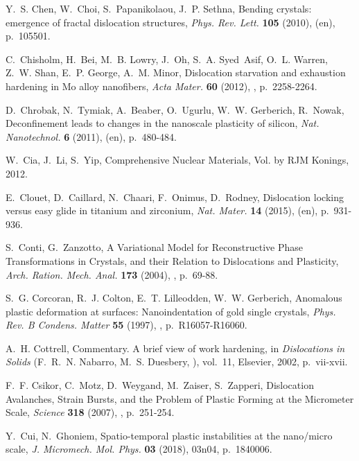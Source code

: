 \documentclass[CRPHYS,Unicode,manuscript]{cedram}
\begin{document}
\begin{thebibliography}{100}
Y.~S. Chen, W.~Choi, S.~Papanikolaou, J.~P. Sethna, {\og Bending crystals:
  emergence of fractal dislocation structures\fg}, \emph{Phys. Rev. Lett.}
  \textbf{105} (2010),  (en), p.~105501.

C.~Chisholm, H.~Bei, M.~B. Lowry, J.~Oh, S.~A. Syed~Asif, O.~L. Warren, Z.~W.
  Shan, E.~P. George, A.~M. Minor, {\og Dislocation starvation and exhaustion
  hardening in Mo alloy nanofibers\fg}, \emph{Acta Mater.} \textbf{60} (2012),
  , p.~2258-2264.

D.~Chrobak, N.~Tymiak, A.~Beaber, O.~Ugurlu, W.~W. Gerberich, R.~Nowak, {\og
  Deconfinement leads to changes in the nanoscale plasticity of silicon\fg},
  \emph{Nat. Nanotechnol.} \textbf{6} (2011),  (en), p.~480-484.

W.~Cia, J.~Li, S.~Yip, {\og Comprehensive Nuclear Materials, Vol. by {RJM}
  Konings\fg}, 2012.

E.~Clouet, D.~Caillard, N.~Chaari, F.~Onimus, D.~Rodney, {\og Dislocation
  locking versus easy glide in titanium and zirconium\fg}, \emph{Nat. Mater.}
  \textbf{14} (2015),  (en), p.~931-936.

S.~Conti, G.~Zanzotto, {\og A Variational Model for Reconstructive Phase
  Transformations in Crystals, and their Relation to Dislocations and
  Plasticity\fg}, \emph{Arch. Ration. Mech. Anal.} \textbf{173} (2004),
  , p.~69-88.

S.~G. Corcoran, R.~J. Colton, E.~T. Lilleodden, W.~W. Gerberich, {\og Anomalous
  plastic deformation at surfaces: Nanoindentation of gold single crystals\fg},
  \emph{Phys. Rev. B Condens. Matter} \textbf{55} (1997), ,
  p.~R16057-R16060.

A.~H. Cottrell, {\og Commentary. A brief view of work hardening\fg}, in
  \emph{Dislocations in Solids} (F.~R.~N. Nabarro, M.~S. Duesbery,
  \cdredsname), vol.~11, Elsevier, 2002, p.~vii-xvii.

F.~F. Csikor, C.~Motz, D.~Weygand, M.~Zaiser, S.~Zapperi, {\og Dislocation
  Avalanches, Strain Bursts, and the Problem of Plastic Forming at the
  Micrometer Scale\fg}, \emph{Science} \textbf{318} (2007), ,
  p.~251-254.

Y.~Cui, N.~Ghoniem, {\og Spatio-temporal plastic instabilities at the
  nano/micro scale\fg}, \emph{J. Micromech. Mol. Phys.} \textbf{03} (2018),
  \cdrnumero 03n04, p.~1840006.


\end{thebibliography}
\end{document}
